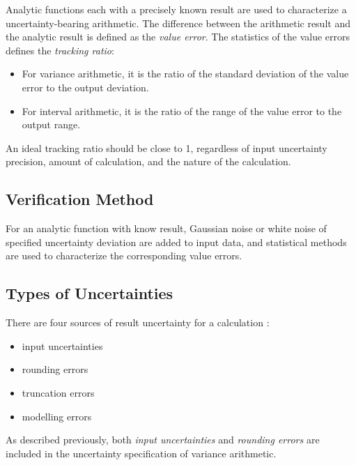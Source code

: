 \documentclass[twoside]{article}
\numberwithin{equation}{section}
\begin{document}
Analytic functions each with a precisely known result are used to characterize a uncertainty-bearing arithmetic. 
The difference between the arithmetic result and the analytic result is defined as the \emph{value error}.
The statistics of the value errors defines the \emph{tracking ratio}:
\begin{itemize}
\item For variance arithmetic, it is the ratio of the standard deviation of the value error to the output deviation.

\item For interval arithmetic, it is the ratio of the range of the value error to the output range.
\end{itemize}
An ideal tracking ratio should be close to 1, regardless of input uncertainty precision, amount of calculation, and the nature of the calculation.


\subsection{Verification Method \cite{Prev_Precision_Arithmetic}}

For an analytic function with know result, Gaussian noise or white noise \cite{Statistical_Methods} of specified uncertainty deviation are added to input data, and statistical methods are used to characterize the corresponding value errors.


\subsection{Types of Uncertainties \cite{Prev_Precision_Arithmetic}}

There are four sources of result uncertainty for a calculation \cite{Statistical_Methods}\cite{Numerical_Recipes}:
\begin{itemize}
\item input uncertainties
\item rounding errors
\item truncation errors
\item modelling errors
\end{itemize}

As described previously, both \emph{input uncertainties} and \emph{rounding errors} are included in the uncertainty specification of variance arithmetic.
\end{document}
